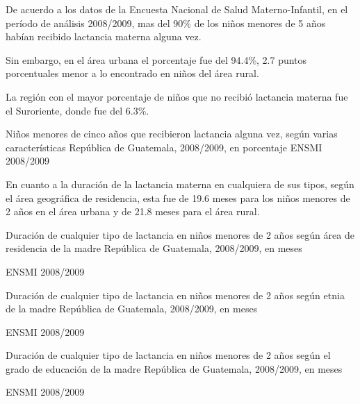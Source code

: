 
{%
De acuerdo a los datos de la Encuesta Nacional de Salud Materno-Infantil, en el período de análisis 2008/2009, mas del 90\% de los niños menores de 5 años habían recibido lactancia materna alguna vez.

Sin embargo, en el área urbana el porcentaje fue del 94.4\%, 2.7 puntos porcentuales menor a lo encontrado en niños del área rural.

La región con el mayor porcentaje de niños que no recibió lactancia materna fue el Suroriente, donde fue del 6.3\%.}%
{%
 Niños menores de cinco años que recibieron lactancia alguna vez, según varias características} %
{%
 República de Guatemala, 2008/2009, en porcentaje} %
{%
}%
{%
 ENSMI 2008/2009} %



%
{%
En cuanto a la duración de la lactancia materna en cualquiera de sus tipos\llamada, según el área geográfica de residencia, esta fue de 19.6 meses para los niños menores de 2 años en el área urbana y de 21.8 meses para el área rural.

}%
{%
	Duración de cualquier tipo de lactancia en niños menores de 2 años según área de residencia de la madre} %
{%
	República de Guatemala, 2008/2009, en meses} %
{%
	\begin{tikzpicture}[x=1pt,y=1pt]    \end{tikzpicture}
}%
{%
	ENSMI 2008/2009} %



%
{%
}%
{%
	Duración de cualquier tipo de lactancia en niños menores de 2 años según etnia de la madre} %
{%
	República de Guatemala, 2008/2009, en meses} %
{%
	\begin{tikzpicture}[x=1pt,y=1pt]    \end{tikzpicture}
}%
{%
	ENSMI 2008/2009} %


%
{%
}%
{%
	Duración de cualquier tipo de lactancia en niños menores de 2 años según el grado de educación de la madre} %
{%
	República de Guatemala, 2008/2009, en meses} %
{%
	\begin{tikzpicture}[x=1pt,y=1pt]    \end{tikzpicture}
}%
{%
	ENSMI 2008/2009} %


